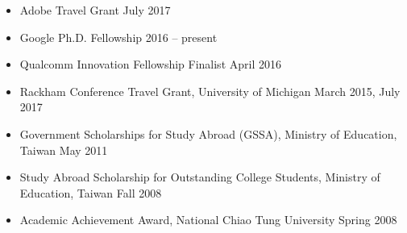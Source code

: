 \documentclass[10pt]{article}
\newenvironment{innerlist}[1][\enskip\textbullet]%
        {\begin{itemize}[#1,leftmargin=*,parsep=0pt,itemsep=0pt,topsep=0pt,partopsep=0pt]}
        {\end{itemize}}
\newcommand{\halfblankline}{\quad\vspace{-0.5\baselineskip}\pagebreak[3]}
\begin{document}
\begin{itemize}[leftmargin=0pt,parsep=3pt,itemsep=0pt,topsep=0pt,partopsep=0pt]
\item[] Adobe Travel Grant \hfill July 2017
\item[] Google Ph.D. Fellowship \hfill 2016 -- present
\item[] Qualcomm Innovation Fellowship Finalist \hfill April 2016
\item[] Rackham Conference Travel Grant, University of Michigan \hfill March 2015, July 2017
\item[] Government Scholarships for Study Abroad (GSSA), Ministry of Education, Taiwan \hfill May 2011
\item[] Study Abroad Scholarship for Outstanding College Students, Ministry of Education, Taiwan \hfill Fall 2008
\item[] Academic Achievement Award, National Chiao Tung University \hfill Spring 2008
\end{itemize}
%
%
%
%
\end{document}
